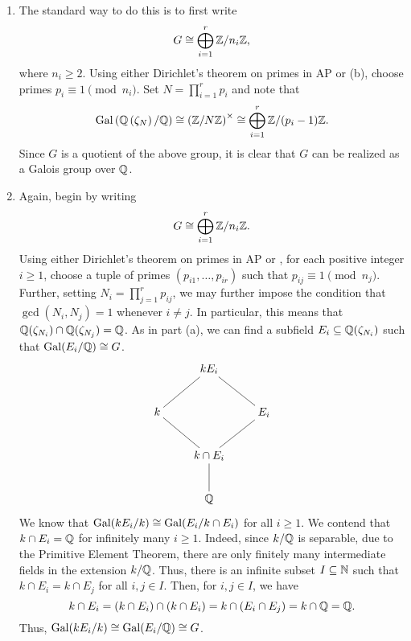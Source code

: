 \setcounter{exercise}{20}
\begin{exercise}
    
\end{exercise}

\setcounter{exercise}{22}

\begin{exercise}
\begin{enumerate}[label=(\alph*)]
\item The standard way to do this is to first write 
\begin{equation*}
    G\cong\bigoplus_{i = 1}^r \mathbb{Z}/n_i\mathbb{Z},
\end{equation*}
where $n_i\ge 2$. Using either Dirichlet's theorem on primes in AP or (b), choose primes $p_i\equiv 1\pmod{n_i}$. Set $\displaystyle N = \prod_{i = 1}^{r}p_i$ and note that 
\begin{equation*}
    \operatorname{Gal}\left(\mathbb{Q}\left(\zeta_N\right)/\mathbb{Q}\right)\cong\left(\mathbb{Z}/N\mathbb{Z}\right)^\times\cong\bigoplus_{i = 1}^r \mathbb{Z}/(p_i - 1)\mathbb{Z}.
\end{equation*}
Since $G$ is a quotient of the above group, it is clear that $G$ can be realized as a Galois group over $\mathbb{Q}$.

\item Again, begin by writing 
\begin{equation*}
    G\cong\bigoplus_{i = 1}^r \mathbb{Z}/n_i\mathbb{Z}.
\end{equation*}
Using either Dirichlet's theorem on primes in AP or , for each positive integer $i\ge 1$, choose a tuple of primes $(p_{i1},\dots,p_{ir})$ such that $p_{ij}\equiv 1\pmod{n_j}$. Further, setting $N_i = \displaystyle\prod_{j = 1}^r p_{ij}$, we may further impose the condition that $\gcd(N_i, N_j) = 1$ whenever $i\ne j$. In particular, this means that $\mathbb{Q}(\zeta_{N_i})\cap\mathbb{Q}(\zeta_{N_j}) = \mathbb{Q}$. As in part (a), we can find a subfield $E_i\subseteq\mathbb{Q}(\zeta_{N_i})$ such that $\operatorname{Gal}(E_i/\mathbb{Q})\cong G$.
\begin{equation*}
    \xymatrix {
        & kE_i & \\
        k\ar@{-}[ru] & & E_i\ar@{-}[lu]\\
        & k\cap E_i\ar@{-}[lu]\ar@{-}[ru] & \\
            & \Q\ar@{-}[u] & 
    }
\end{equation*}
We know that $\operatorname{Gal}(kE_i/k)\cong\operatorname{Gal}(E_i/k\cap E_i)$ for all $i\ge 1$. We contend that $k\cap E_i = \mathbb{Q}$ for infinitely many $i\ge 1$. Indeed, since $k/\mathbb{Q}$ is separable, due to the Primitive Element Theorem, there are only finitely many intermediate fields in the extension $k/\mathbb{Q}$. Thus, there is an infinite subset $I\subseteq\mathbb{N}$ such that $k\cap E_i = k\cap E_j$ for all $i,j\in I$. Then, for $i,j\in I$, we have 
\begin{equation*}
    k\cap E_i = (k\cap E_i)\cap(k\cap E_i) = k\cap (E_i\cap E_j) = k\cap\mathbb{Q} = \mathbb{Q}.
\end{equation*}
Thus, $\operatorname{Gal}(kE_i/k)\cong\operatorname{Gal}(E_i/\mathbb{Q})\cong G$.


\end{enumerate}
\end{exercise}
